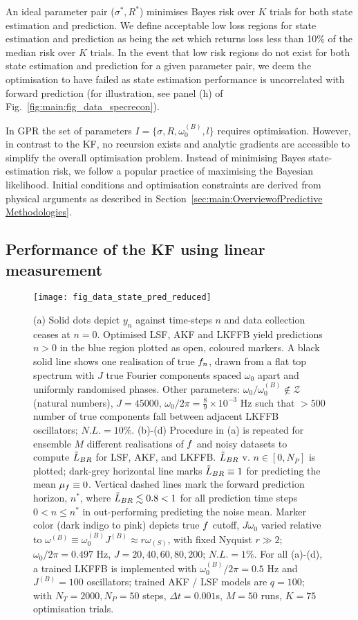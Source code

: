 An ideal parameter pair ($\sigma^*, R^*$) minimises Bayes risk over $K$ trials for both state estimation and prediction.  We define acceptable low loss regions for state estimation and prediction as being the set which returns loss less than 10\% of the median risk over $K$ trials.  In the event that low risk regions do not exist for both state estimation and prediction for a given parameter pair, we deem the optimisation to have failed as state estimation performance is uncorrelated with forward prediction (for illustration, see panel (h) of Fig.~\ref{fig:main:fig_data_specrecon}).

In GPR the set of parameters $I = \{\sigma, R, \omega_0^{(B)}, l \}$ requires optimisation.  However, in contrast to the KF, no recursion exists and analytic gradients are accessible to simplify the overall optimisation problem. Instead of minimising Bayes state-estimation risk, we follow a popular practice of maximising the Bayesian likelihood. Initial conditions and optimisation constraints are derived from physical arguments as described in Section~\ref{sec:main:OverviewofPredictive Methodologies}.

\subsection{Performance of the KF using linear measurement}
\begin{figure}
	\texttt{[image: fig\_data\_state\_pred\_reduced]}
	\caption{\label{fig:main:fig_data_state_pred} (a) Solid dots depict $y_n$ against time-steps $n$ and data collection ceases at $n=0$. Optimised LSF, AKF and LKFFB yield predictions $n>0$ in the blue region plotted as open, coloured markers. A black solid line shows one realisation of true $f_n$, drawn from a flat top spectrum with $J$ true Fourier components spaced $\omega_0$ apart and uniformly randomised phases. Other parameters: $\omega_0 / \omega_0^{(B)}  \notin \mathcal{Z}$ (natural numbers), $J = 45000$, $\omega_0 / 2\pi = \frac{8}{9} \times 10^{-3}$ Hz such that $>500$ number of true components fall between adjacent LKFFB oscillators; $ N.L.= 10\%$. (b)-(d) Procedure in (a) is repeated for ensemble $M$ different realisations of $f$ and noisy datasets to compute $\tilde{L}_{BR}$ for LSF, AKF, and LKFFB. $\tilde{L}_{BR}$ v. $n \in [0, N_P]$ is plotted; dark-grey horizontal line marks $\tilde{L}_{BR} \equiv 1$ for predicting the mean $\mu_f \equiv 0$. Vertical dashed lines mark the forward prediction horizon, $ n^* $, where $  \tilde{L}_{BR} \lesssim 0.8 < 1$ for all prediction time steps  $0< n \leq n^*$ in out-performing predicting the noise mean. Marker color (dark indigo to pink) depicts true $f$ cutoff, $J\omega_0$ varied relative to $\omega^{(B)} \equiv \omega_0^{(B)}J^{(B)} \approx r \omega_{(S)}$, with fixed Nyquist $r\gg2$; $\omega_0 / 2\pi = 0.497$ Hz, $J = 20, 40, 60, 80, 200$; $N.L. = 1\%$.  For all (a)-(d), a trained LKFFB is implemented with $\omega_0^{(B)} / 2\pi = 0.5$ Hz and $J^{(B)} =100$ oscillators; trained AKF / LSF models are $q = 100$; with $N_T = 2000, N_P = 50$ steps, $\Delta t = 0.001$s, $M=50$ runs, $K=75$ optimisation trials.} 
\end{figure}  


